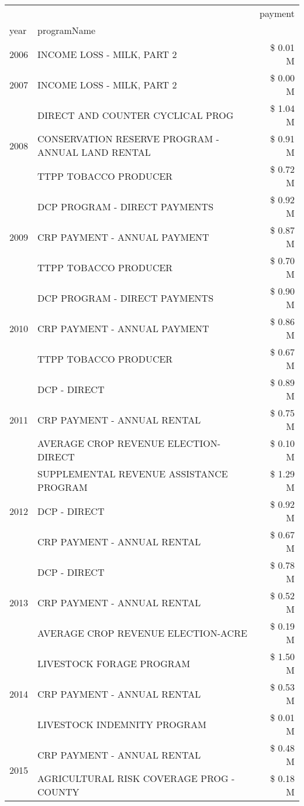\begin{tabular}{llr}
\toprule
 &  & payment \\
year & programName &  \\
\midrule
2006 & INCOME LOSS - MILK, PART 2 & \$ 0.01 M \\
\cline{1-3}
2007 & INCOME LOSS - MILK, PART 2 & \$ 0.00 M \\
\cline{1-3}
\multirow[t]{3}{*}{2008} & DIRECT AND COUNTER CYCLICAL PROG & \$ 1.04 M \\
 & CONSERVATION RESERVE PROGRAM - ANNUAL LAND RENTAL & \$ 0.91 M \\
 & TTPP TOBACCO PRODUCER & \$ 0.72 M \\
\cline{1-3}
\multirow[t]{3}{*}{2009} & DCP PROGRAM - DIRECT PAYMENTS & \$ 0.92 M \\
 & CRP PAYMENT - ANNUAL PAYMENT & \$ 0.87 M \\
 & TTPP TOBACCO PRODUCER & \$ 0.70 M \\
\cline{1-3}
\multirow[t]{3}{*}{2010} & DCP PROGRAM - DIRECT PAYMENTS & \$ 0.90 M \\
 & CRP PAYMENT - ANNUAL PAYMENT & \$ 0.86 M \\
 & TTPP TOBACCO PRODUCER & \$ 0.67 M \\
\cline{1-3}
\multirow[t]{3}{*}{2011} & DCP - DIRECT & \$ 0.89 M \\
 & CRP PAYMENT - ANNUAL RENTAL & \$ 0.75 M \\
 & AVERAGE CROP REVENUE ELECTION-DIRECT & \$ 0.10 M \\
\cline{1-3}
\multirow[t]{3}{*}{2012} & SUPPLEMENTAL REVENUE ASSISTANCE PROGRAM & \$ 1.29 M \\
 & DCP - DIRECT & \$ 0.92 M \\
 & CRP PAYMENT - ANNUAL RENTAL & \$ 0.67 M \\
\cline{1-3}
\multirow[t]{3}{*}{2013} & DCP - DIRECT & \$ 0.78 M \\
 & CRP PAYMENT - ANNUAL RENTAL & \$ 0.52 M \\
 & AVERAGE CROP REVENUE ELECTION-ACRE & \$ 0.19 M \\
\cline{1-3}
\multirow[t]{3}{*}{2014} & LIVESTOCK FORAGE PROGRAM & \$ 1.50 M \\
 & CRP PAYMENT - ANNUAL RENTAL & \$ 0.53 M \\
 & LIVESTOCK INDEMNITY PROGRAM & \$ 0.01 M \\
\cline{1-3}
\multirow[t]{3}{*}{2015} & CRP PAYMENT - ANNUAL RENTAL & \$ 0.48 M \\
 & AGRICULTURAL RISK COVERAGE PROG - COUNTY & \$ 0.18 M \\

\end{tabular}
